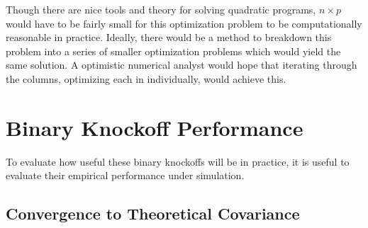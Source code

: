 \documentclass[11pt]{article}
\theoremstyle{definition}
\begin{document}
            Though there are nice tools and theory for solving quadratic programs, $n\times p$ would have to be fairly small for this optimization problem to be computationally reasonable in practice. Ideally, there would be a method to breakdown this problem into a series of smaller optimization problems which would yield the same solution. A optimistic numerical analyst would hope that iterating through the columns, optimizing each in individually, would achieve this. 

            




\section{Binary Knockoff Performance}
    To evaluate how useful these binary knockoffs will be in practice, it is useful to evaluate their empirical performance under simulation. 

\subsection{Convergence to Theoretical Covariance} 
\end{document}
